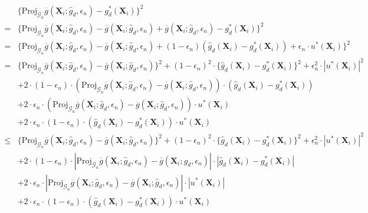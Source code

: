 \documentclass[11pt]{article}
\numberwithin{equation}{section}
\begin{document}
\begin{align*}
	&\{\text{Proj}_{\mathcal{G}_n}\overline{g}(\boldsymbol{X}_{i};\widehat{g}_d,\epsilon_n)-g^*_d(\boldsymbol{X}_{i})\}^2\\
	=&\{\text{Proj}_{\mathcal{G}_n}\overline{g}(\boldsymbol{X}_{i};\widehat{g}_d,\epsilon_n)-\overline{g}(\boldsymbol{X}_{i};\widehat{g}_d,\epsilon_n)+\overline{g}(\boldsymbol{X}_{i};\widehat{g}_d,\epsilon_n)-g^*_d(\boldsymbol{X}_{i})\}^2\\
	=&\{\text{Proj}_{\mathcal{G}_n}\overline{g}(\boldsymbol{X}_{i};\widehat{g}_d,\epsilon_n)-\overline{g}(\boldsymbol{X}_{i};\widehat{g}_d,\epsilon_n)+(1-\epsilon_n)(\widehat{g}_d(\boldsymbol{X}_{i})-g^*_d(\boldsymbol{X}_{i}))+\epsilon_n\cdot u^*(\boldsymbol{X}_{i})\}^2\\
	=&\{\text{Proj}_{\mathcal{G}_n}\overline{g}(\boldsymbol{X}_{i};\widehat{g}_d,\epsilon_n)-\overline{g}(\boldsymbol{X}_{i};\widehat{g}_d,\epsilon_n)\}^2+(1-\epsilon_n)^2\cdot \{\widehat{g}_d(\boldsymbol{X}_{i})-g^*_d(\boldsymbol{X}_{i})\}^2+\epsilon^2_n\cdot |u^*(\boldsymbol{X}_{i})|^2\\
	&+2\cdot(1-\epsilon_n)\cdot (\text{Proj}_{\mathcal{G}_n}\overline{g}(\boldsymbol{X}_{i};\widehat{g}_d,\epsilon_n)-\overline{g}(\boldsymbol{X}_{i};\widehat{g}_d,\epsilon_n)) \cdot (\widehat{g}_d(\boldsymbol{X}_{i})-g^*_d(\boldsymbol{X}_{i})) \\
	&+2\cdot \epsilon_n \cdot (\text{Proj}_{\mathcal{G}_n}\overline{g}(\boldsymbol{X}_{i};\widehat{g}_d,\epsilon_n)-\overline{g}(\boldsymbol{X}_{i};\widehat{g}_d,\epsilon_n)) \cdot u^*(\boldsymbol{X}_{i}) \\
	&+2\cdot \epsilon_n \cdot (1-\epsilon_n)\cdot (\widehat{g}_d(\boldsymbol{X}_{i})-g^*_d(\boldsymbol{X}_{i})) \cdot u^*(\boldsymbol{X}_{i})\\
	\leq & 	\{\text{Proj}_{\mathcal{G}_n}\overline{g}(\boldsymbol{X}_{i};\widehat{g}_d,\epsilon_n)-\overline{g}(\boldsymbol{X}_{i};\widehat{g}_d,\epsilon_n)\}^2+(1-\epsilon_n)^2\cdot \{\widehat{g}_d(\boldsymbol{X}_{i})-g^*_d(\boldsymbol{X}_{i})\}^2+\epsilon^2_n\cdot |u^*(\boldsymbol{X}_{i})|^2\\
	&+2\cdot(1-\epsilon_n)\cdot |\text{Proj}_{\mathcal{G}_n}\overline{g}(\boldsymbol{X}_{i};\widehat{g}_d,\epsilon_n)-\overline{g}(\boldsymbol{X}_{i};\widehat{g}_d,\epsilon_n)| \cdot |\widehat{g}_d(\boldsymbol{X}_{i})-g^*_d(\boldsymbol{X}_{i})| \\
	&+2\cdot \epsilon_n \cdot |\text{Proj}_{\mathcal{G}_n}\overline{g}(\boldsymbol{X}_{i};\widehat{g}_d,\epsilon_n)-\overline{g}(\boldsymbol{X}_{i};\widehat{g}_d,\epsilon_n)|\cdot |u^*(\boldsymbol{X}_{i})| \\
	&+2\cdot \epsilon_n \cdot (1-\epsilon_n)\cdot (\widehat{g}_d(\boldsymbol{X}_{i})-g^*_d(\boldsymbol{X}_{i})) \cdot u^*(\boldsymbol{X}_{i})
\end{align*}
\end{document}

